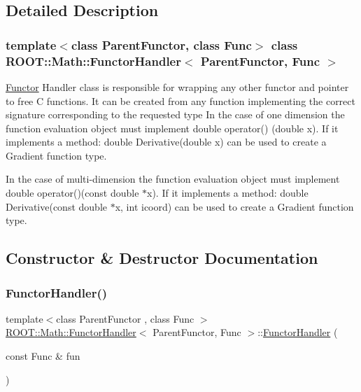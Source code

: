 \subsection{Detailed Description}
\subsubsection*{template$<$class Parent\+Functor, class Func$>$\newline
class R\+O\+O\+T\+::\+Math\+::\+Functor\+Handler$<$ Parent\+Functor, Func $>$}

\mbox{\hyperlink{classROOT_1_1Math_1_1Functor}{Functor}} Handler class is responsible for wrapping any other functor and pointer to free C functions. It can be created from any function implementing the correct signature corresponding to the requested type In the case of one dimension the function evaluation object must implement double operator() (double x). If it implements a method\+: double Derivative(double x) can be used to create a Gradient function type.

In the case of multi-\/dimension the function evaluation object must implement double operator()(const double $\ast$x). If it implements a method\+: double Derivative(const double $\ast$x, int icoord) can be used to create a Gradient function type. 

\subsection{Constructor \& Destructor Documentation}
\mbox{\label{classROOT_1_1Math_1_1FunctorHandler_ae8715a95fff0a4bbaba7a1641f936257}} 
\subsubsection{\texorpdfstring{FunctorHandler()}{FunctorHandler()}\hspace{0.1cm}{\footnotesize\ttfamily [1/6]}}
{\footnotesize\ttfamily template$<$class Parent\+Functor , class Func $>$ \\
\mbox{\hyperlink{classROOT_1_1Math_1_1FunctorHandler}{R\+O\+O\+T\+::\+Math\+::\+Functor\+Handler}}$<$ Parent\+Functor, Func $>$\+::\mbox{\hyperlink{classROOT_1_1Math_1_1FunctorHandler}{Functor\+Handler}} (\begin{DoxyParamCaption}\item[{const Func \&}]{fun }\end{DoxyParamCaption})\hspace{0.3cm}{\ttfamily [inline]}}

